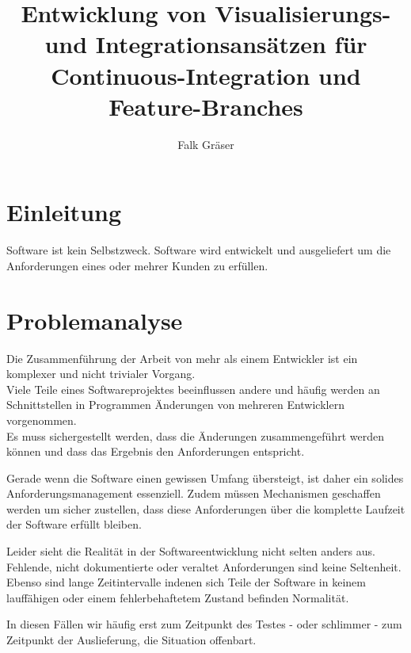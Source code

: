 \documentclass[10pt,a4paper]{book}
\author{Falk Gräser}
\title{Entwicklung von Visualisierungs- und Integrationsansätzen für Continuous-Integration und Feature-Branches}
\begin{document}
\maketitle

\tableofcontents

\chapter{Einleitung}

Software ist kein Selbstzweck. Software wird entwickelt und ausgeliefert um die Anforderungen eines oder mehrer Kunden zu erfüllen.

\chapter{Problemanalyse}



Die Zusammenführung der Arbeit von mehr als einem Entwickler ist ein komplexer und nicht trivialer Vorgang. \\
Viele Teile eines Softwareprojektes beeinflussen andere und häufig werden an Schnittstellen in Programmen Änderungen von mehreren Entwicklern vorgenommen. \\
Es muss sichergestellt werden, dass die Änderungen zusammengeführt werden können und dass das Ergebnis den Anforderungen entspricht.

Gerade wenn die Software einen gewissen Umfang übersteigt, ist daher ein solides Anforderungsmanagement essenziell. Zudem müssen Mechanismen geschaffen werden um sicher zustellen, dass diese Anforderungen über die komplette Laufzeit der Software erfüllt bleiben. 

Leider sieht die Realität in der Softwareentwicklung nicht selten anders aus. Fehlende, nicht dokumentierte oder veraltet Anforderungen sind keine Seltenheit.\\
Ebenso sind lange Zeitintervalle indenen sich Teile der Software in keinem lauffähigen oder einem fehlerbehaftetem Zustand befinden Normalität.

In diesen Fällen wir häufig erst zum Zeitpunkt des Testes - oder schlimmer - zum Zeitpunkt der Auslieferung, die Situation offenbart.
\end{document}
